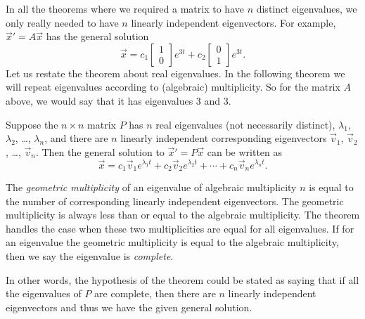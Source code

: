 In all the
theorems where we required a matrix to have $n$ distinct eigenvalues, we only
really needed to have $n$ linearly independent eigenvectors.  For example,
${\vec{x}}' = A\vec{x}$ has the general solution
\begin{equation*}
\vec{x} = 
c_1 \begin{bmatrix} 1 \\ 0 \end{bmatrix} e^{3t}
+ c_2 \begin{bmatrix} 0 \\ 1 \end{bmatrix} e^{3t} .
\end{equation*}
Let us restate the theorem about real eigenvalues.  In the following theorem
we will repeat eigenvalues according to (algebraic) multiplicity.  So
for the matrix $A$ above, we would say that it has eigenvalues 3 and 3.

\begin{theorem}
Suppose the $n \times n$ matrix $P$ 
has $n$ real eigenvalues (not necessarily distinct), $\lambda_1$,
$\lambda_2$, \ldots, $\lambda_n$,
and there are $n$ linearly independent corresponding eigenvectors
$\vec{v}_1$, $\vec{v}_2$, \ldots, $\vec{v}_n$.  Then the general solution to 
${\vec{x}}' = P\vec{x}$
can be written as
\begin{equation*}
\vec{x} = c_1 \vec{v}_1 e^{\lambda_1 t} +
c_2 \vec{v}_2 e^{\lambda_2 t} + \cdots +
c_n \vec{v}_n e^{\lambda_n t} .
\end{equation*}
\end{theorem}

The \emph{geometric multiplicity} of an eigenvalue of algebraic multiplicity $n$
is equal to the number of corresponding linearly independent eigenvectors.
The geometric multiplicity is always less than or
equal to the algebraic multiplicity.  The theorem handles the case
when these two multiplicities are equal for all eigenvalues.
If for an eigenvalue the geometric multiplicity is equal
to the algebraic multiplicity, then we say the eigenvalue is
\emph{complete}.

In other words, 
the hypothesis of the theorem could be stated as saying that if all
the eigenvalues of $P$ are complete, then there are $n$ linearly independent
eigenvectors and thus we have the given general solution.

\medskip

